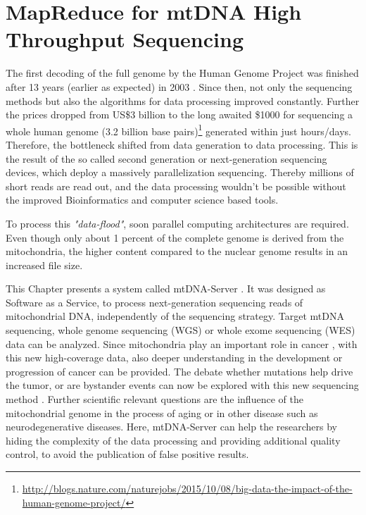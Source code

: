 \chapter{MapReduce for mtDNA High Throughput Sequencing}
\label{chap:NGS}

The first decoding of the full genome by the Human Genome Project was finished after 13 years (earlier as expected) in 2003 \cite{InternationalHumanGenomeSequencingConsortium2004}. Since then, not only the sequencing methods but also the algorithms for data processing improved constantly. Further the prices dropped from US\$3 billion to the long awaited \$1000 for sequencing a whole human genome (3.2 billion base pairs)\footnote{\url{http://blogs.nature.com/naturejobs/2015/10/08/big-data-the-impact-of-the-human-genome-project/}} generated within just hours/days. Therefore, the bottleneck shifted from data generation to data processing. This is the result of the so called second generation or next-generation sequencing devices, which deploy a massively parallelization sequencing. Thereby millions of short reads are read out, and the data processing wouldn't be possible without the improved Bioinformatics and computer science based tools. 

To process this \textit{"data-flood"}, soon parallel computing architectures are required. Even though only about 1 percent of the complete genome is derived from the mitochondria, the higher content compared to the nuclear genome results in an increased file size. 

This Chapter presents a system called mtDNA-Server \cite{Weissensteiner2016b}. It was designed as Software as a Service, to process next-generation sequencing reads of mitochondrial DNA, independently of the sequencing strategy. Target mtDNA sequencing, whole genome sequencing (WGS) or whole exome sequencing (WES) data can be analyzed. Since mitochondria play an important role in cancer \cite{Brandon2006,He2010,Guo2012,KlossBrandstatter2010}, with this new high-coverage data, also deeper understanding in the development or progression of cancer can be provided. The debate whether mutations help drive the tumor, or are bystander events can now be explored with this new sequencing method \cite{McMahon2014,Kloss-Brandstatter2015}. Further scientific relevant questions are the influence of the mitochondrial genome in the process of aging or in other disease such as neurodegenerative diseases. Here, mtDNA-Server can help the researchers by hiding the complexity of the data processing and providing additional quality control, to avoid the publication of false positive results. 

